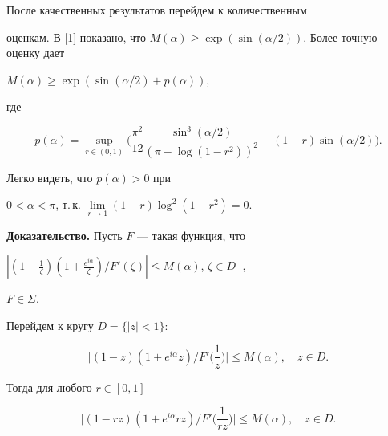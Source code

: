 После качественных результатов перейдем к количественным


оценкам. В [1] показано, что $M(\alpha) \ge


\exp(\sin(\alpha/2))$. Более точную оценку дает





\begin{thm} $M(\alpha) \ge \exp(\sin(\alpha/2)+p(\alpha))$,


где


$$


p(\alpha)=


\sup_{r \in (0,1)}\bigg(


\frac{\pi^2}{12}\frac{\sin^3(\alpha/2)}{(\pi-\log(1-r^2))^2}


-(1-r)\sin(\alpha/2)\bigg).


$$


\end{thm}





\begin{notenonum} Легко видеть, что $p(\alpha)>0$ при


$0< \alpha< \pi$, т.\,к. $\lim\limits_{r \to 1}(1-r)\log^2(1-r^2)=0.$


\end{notenonum}





{\bf Доказательство.} Пусть $F$ --- такая функция, что


$\left|\left(1-\frac{1}{\zeta}\right)\left(1+


\frac{e^{i\alpha}}{\zeta}\right)/


F'(\zeta)\right| \leq M(\alpha)$, $\zeta \in D^-$,


$F \in \Sigma$.


Перейдем к кругу $D = \{ |z|<1 \}:$


$$


\bigg|(1-z)(1+e^{i\alpha}z)/


F'\bigg(\frac{1}{z}\bigg)\bigg| \leq M(\alpha), \quad z \in D.


$$


Тогда для любого $r \in [0,1] $


$$


\bigg|(1-rz)(1+e^{i\alpha}rz)/


F'\bigg(\frac{1}{rz}\bigg)\bigg| \leq M(\alpha), \quad z \in D.


$$





